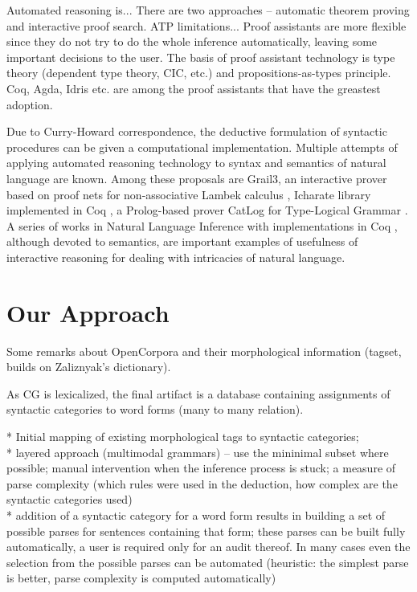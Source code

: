 \documentclass[a4paper]{article}
\theoremstyle{example-style}
\begin{document}
Automated reasoning is... There are two approaches -- automatic theorem proving and interactive proof search. ATP limitations... Proof assistants are more flexible since they do not try to do the whole inference automatically, leaving some important decisions to the user. The basis of proof assistant technology is type theory (dependent type theory, CIC, etc.) and propositions-as-types principle. Coq, Agda, Idris etc. are among the proof assistants that have the greastest adoption. 

Due to Curry-Howard correspondence, the deductive formulation of syntactic procedures can be given a computational implementation. Multiple attempts of applying automated reasoning technology to syntax and semantics of natural language are known. Among these proposals are Grail3, an interactive prover based on proof nets for non-associative Lambek calculus \parencite{moot2002proof}, Icharate library implemented in Coq \parencite{anoun2007approche}, a Prolog-based prover CatLog for Type-Logical Grammar \parencite{morrill2012catlog}. A series of works in Natural Language Inference with implementations in Coq \parencite{chatzikyriakidis2014natural}, although devoted to semantics, are important examples of usefulness of interactive reasoning for dealing with intricacies of natural language.


\section{Our Approach}

Some remarks about OpenCorpora and their morphological information (tagset, builds on Zaliznyak's dictionary).

As CG is lexicalized, the final artifact is a database containing assignments of syntactic categories to word forms (many to many relation).

  * Initial mapping of existing morphological tags to syntactic categories; \\
  
  * layered approach (multimodal grammars) -- use the mininimal subset where possible; manual intervention when the inference process is stuck; a measure of parse complexity (which rules were used in the deduction, how complex are the syntactic categories used) \\
    
  * addition of a syntactic category for a word form results in building a set of possible parses for sentences containing that form; these parses can be built fully automatically, a user is required only for an audit thereof. In many cases even the selection from the possible parses can be automated (heuristic: the simplest parse is better, parse complexity is computed automatically) \\
  
\end{document}
